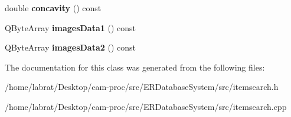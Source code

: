 \begin{DoxyCompactItemize}
\item 
double {\bfseries concavity} () const \hypertarget{classitemSearch_a5b5a52a90d7b7b41789c010455dcc05c}{}\label{classitemSearch_a5b5a52a90d7b7b41789c010455dcc05c}

\item 
Q\+Byte\+Array {\bfseries images\+Data1} () const \hypertarget{classitemSearch_aaf476d641b2b093e2c4b6c9e13eb5902}{}\label{classitemSearch_aaf476d641b2b093e2c4b6c9e13eb5902}

\item 
Q\+Byte\+Array {\bfseries images\+Data2} () const \hypertarget{classitemSearch_aad4d7ea898c8ab70b471aeec4bafa803}{}\label{classitemSearch_aad4d7ea898c8ab70b471aeec4bafa803}

\end{DoxyCompactItemize}


The documentation for this class was generated from the following files\+:\begin{DoxyCompactItemize}
\item 
/home/labrat/\+Desktop/cam-\/proc/src/\+E\+R\+Database\+System/src/itemsearch.\+h\item 
/home/labrat/\+Desktop/cam-\/proc/src/\+E\+R\+Database\+System/src/itemsearch.\+cpp\end{DoxyCompactItemize}
